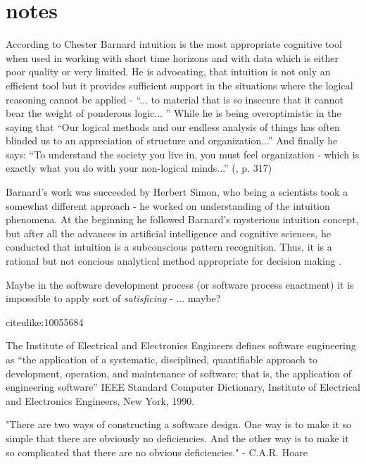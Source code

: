 \chapter{notes}

According to Chester Barnard \cite{citeulike:1414171} intuition is the most appropriate 
cognitive tool when used in working with short time horizons and with data which is either 
poor quality or very limited. He is advocating, that intuition is not only an efficient 
tool but it provides sufficient support in the situations where the logical reasoning 
cannot be applied - ``... to material that is so insecure that it cannot bear the weight 
of ponderous logic... '' 
While he is being overoptimistic in the saying that ``Our logical methods and our endless 
analysis of things has often blinded us to an appreciation of structure and organization...''
And finally he says: ``To understand the society you live in, you must feel organization - 
which is exactly what you do with your non-logical minds...'' (\cite{citeulike:1414171}, p. 317)

Barnard's work was succeeded by Herbert Simon, who being a scientists took a somewhat 
different approach - he worked on understanding of the intuition phenomena. At the beginning 
he followed Barnard's mysterious intuition concept, but after all the advances in artificial
intelligence and cognitive sciences, he conducted that intuition is a subconscious pattern 
recognition. Thus, it is a rational but not concious analytical method appropriate for decision 
making \cite{citeulike:6708618}. 

Maybe in the software development process (or software process enactment) it is impossible 
to apply sort of \textsl{satisficing} \cite{citeulike:10055914} - ... maybe?



citeulike:10055684

The Institute of Electrical and Electronics Engineers defines software engineering as 
“the application of a systematic, disciplined, quantifiable approach to development, 
operation, and maintenance of software; that is, the application of engineering software”
IEEE Standard Computer Dictionary, Institute
of Electrical and Electronics Engineers, New
York, 1990.

"There are two ways of constructing a software design. One way is to make it so simple 
that there are obviously no deficiencies. And the other way is to make it so complicated that
there are no obvious deficiencies."
- C.A.R. Hoare

